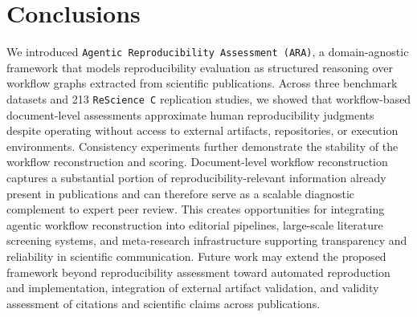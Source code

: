 \documentclass{article}
\begin{document}
\section{Conclusions}

We introduced \texttt{Agentic Reproducibility Assessment (ARA)}, a domain-agnostic framework that models reproducibility evaluation as structured reasoning over workflow graphs extracted from scientific publications.
Across three benchmark datasets and 213 \texttt{ReScience~C} replication studies, we showed that workflow-based document-level assessments approximate human reproducibility judgments despite operating without access to external artifacts, repositories, or execution environments.
Consistency experiments further demonstrate the stability of the workflow reconstruction and scoring.
Document-level workflow reconstruction captures a substantial portion of reproducibility-relevant information already present in publications and can therefore serve as a scalable diagnostic complement to expert peer review.
This creates opportunities for integrating agentic workflow reconstruction into editorial pipelines, large-scale literature screening systems, and meta-research infrastructure supporting transparency and reliability in scientific communication.
Future work may extend the proposed framework beyond reproducibility assessment toward automated reproduction and implementation, integration of external artifact validation, and validity assessment of citations and scientific claims across publications.

    
    
    




\end{document}
